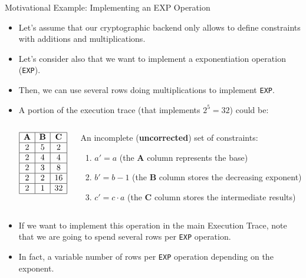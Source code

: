 \ifCOMMENT
\begin{frame}{Motivational Example: Implementing an EXP Operation}
\begin{itemize}
\small
\item Let's assume that our cryptographic backend only allows to define constraints with additions and multiplications.
\item Let's consider also that we want to implement a exponentiation operation (\texttt{EXP}).
\item Then, we can use several rows doing multiplications to implement \texttt{EXP}.
\item A portion of the execution trace (that implements $2^5 = 32$) could be:
\begin{columns}
\begin{column}{0.2\textwidth}
$$
\begin{array}{|c|c|c|}
\hline
\textbf{A} & \textbf{B} & \textbf{C} \\ \hline
2 & 5 & 2  \\ \hline
2 & 4 & 4  \\ \hline
2 & 3 & 8  \\ \hline
2 & 2 & 16 \\ \hline
2 & 1 & 32 \\ \hline
\end{array}$$
\end{column}

\begin{column}{0.7\textwidth}
\small
An incomplete (\textbf{uncorrected}) set of constraints:

\vspace{0.1cm}
\begin{enumerate}
\small
\item $a'=a$ \quad 
(the \textbf{A} column represents the base)
\item $b'=b-1$ \quad 
(the \textbf{B} column stores the decreasing exponent)
\item $c'=c\cdot a$ \quad 
(the \textbf{C} column stores the intermediate results)
\end{enumerate}
\end{column}
\end{columns}

\vspace{0.2cm}
\item If we want to implement this operation in the main Execution Trace, note that
we are going to spend several rows per \texttt{EXP} operation.
\item In fact, a variable number of rows per \texttt{EXP} operation depending on the exponent.
\end{itemize}
\end{frame}










